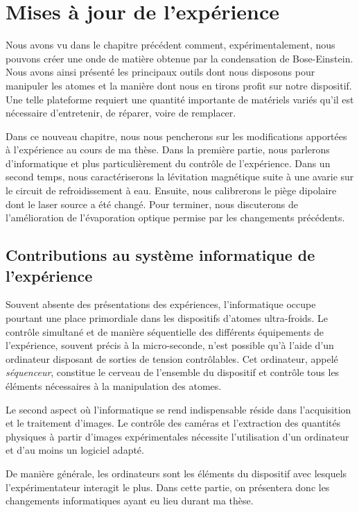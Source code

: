 \chapter{Mises à jour de l'expérience}
\label{ch:new_exp}

Nous avons vu dans le chapitre précédent comment, expérimentalement, nous pouvons créer une onde de matière obtenue par la condensation de Bose-Einstein. Nous avons ainsi présenté les principaux outils dont nous disposons pour manipuler les atomes et la manière dont nous en tirons profit sur notre dispositif. Une telle plateforme requiert une quantité importante de matériels variés qu'il est nécessaire d'entretenir, de réparer, voire de remplacer. 

Dans ce nouveau chapitre, nous nous pencherons sur les modifications apportées à l'expérience au cours de ma thèse. Dans la première partie, nous parlerons d'informatique et plus particulièrement du contrôle de l'expérience. Dans un second temps, nous caractériserons la lévitation magnétique suite à une avarie sur le circuit de refroidissement à eau. Ensuite, nous calibrerons le piège dipolaire dont le laser source a été changé. Pour terminer, nous discuterons de l'amélioration de l'évaporation optique permise par les changements précédents.

\section{Contributions au système informatique de l'expérience}
Souvent absente des présentations des expériences, l'informatique occupe pourtant une place primordiale dans les dispositifs d'atomes ultra-froids. Le contrôle simultané et de manière séquentielle des différents équipements de l'expérience, souvent précis à la micro-seconde, n'est possible qu'à l'aide d'un ordinateur disposant de sorties de tension contrôlables. Cet ordinateur, appelé \emph{séquenceur}, constitue le cerveau de l'ensemble du dispositif et contrôle tous les éléments nécessaires à la manipulation des atomes.

Le second aspect où l'informatique se rend indispensable réside dans l'acquisition et le traitement d'images. Le contrôle des caméras et l'extraction des quantités physiques à partir d'images expérimentales nécessite l'utilisation d'un ordinateur et d'au moins un logiciel adapté. 

De manière générale, les ordinateurs sont les éléments du dispositif avec lesquels l'expérimentateur interagit le plus. Dans cette partie, on présentera donc les changements informatiques ayant eu lieu durant ma thèse.

